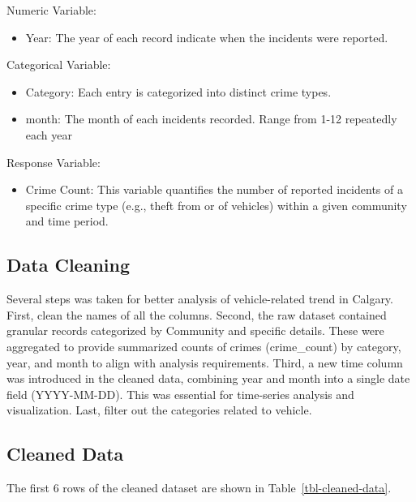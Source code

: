 \documentclass[
  letterpaper,
  DIV=11,
  numbers=noendperiod]{scrartcl}
\providecommand{\tightlist}{%
  \setlength{\itemsep}{0pt}\setlength{\parskip}{0pt}}\usepackage{longtable,booktabs,array}
\begin{document}
Numeric Variable:

\begin{itemize}
\tightlist
\item
  Year: The year of each record indicate when the incidents were
  reported.
\end{itemize}

Categorical Variable:

\begin{itemize}
\item
  Category: Each entry is categorized into distinct crime types.
\item
  month: The month of each incidents recorded. Range from 1-12
  repeatedly each year
\end{itemize}

Response Variable:

\begin{itemize}
\tightlist
\item
  Crime Count: This variable quantifies the number of reported incidents
  of a specific crime type (e.g., theft from or of vehicles) within a
  given community and time period.
\end{itemize}

\subsection{Data Cleaning}\label{data-cleaning}

Several steps was taken for better analysis of vehicle-related trend in
Calgary. First, clean the names of all the columns. Second, the raw
dataset contained granular records categorized by Community and specific
details. These were aggregated to provide summarized counts of crimes
(crime\_count) by category, year, and month to align with analysis
requirements. Third, a new time column was introduced in the cleaned
data, combining year and month into a single date field (YYYY-MM-DD).
This was essential for time-series analysis and visualization. Last,
filter out the categories related to vehicle.

\subsection{Cleaned Data}\label{cleaned-data}

The first 6 rows of the cleaned dataset are shown in
Table~\ref{tbl-cleaned-data}.
\end{document}
